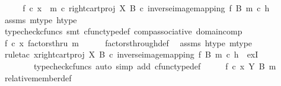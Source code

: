 \begin{isabellebody}
\ \ \isamarkupfalse%
\ \isamarkupfalse%
\ {\isachardoublequoteopen}f\ {\isasymcirc}\isactrlsub c\ x\ {\isacharequal}{\kern0pt}\ m\ {\isasymcirc}\isactrlsub c\ right{\isacharunderscore}{\kern0pt}cart{\isacharunderscore}{\kern0pt}proj\ X\ B\ {\isasymcirc}\isactrlsub c\ inverse{\isacharunderscore}{\kern0pt}image{\isacharunderscore}{\kern0pt}mapping\ f\ B\ m\ {\isasymcirc}\isactrlsub c\ h{\isachardoublequoteclose}\isanewline
\ \ \ \ \isamarkupfalse%
\ assms\ m{\isacharunderscore}{\kern0pt}type\ h{\isacharunderscore}{\kern0pt}type\ \isamarkupfalse%
\ {\isacharparenleft}{\kern0pt}typecheck{\isacharunderscore}{\kern0pt}cfuncs{\isacharcomma}{\kern0pt}\ smt\ cfunc{\isacharunderscore}{\kern0pt}type{\isacharunderscore}{\kern0pt}def\ comp{\isacharunderscore}{\kern0pt}associative\ domain{\isacharunderscore}{\kern0pt}comp{\isacharparenright}{\kern0pt}\isanewline
\ \ \isamarkupfalse%
\ \isamarkupfalse%
\ {\isachardoublequoteopen}{\isacharparenleft}{\kern0pt}f\ {\isasymcirc}\isactrlsub c\ x{\isacharparenright}{\kern0pt}\ factorsthru\ m{\isachardoublequoteclose}\isanewline
\ \ \ \ \isamarkupfalse%
\ factors{\isacharunderscore}{\kern0pt}through{\isacharunderscore}{\kern0pt}def\ \isamarkupfalse%
\ assms\ h{\isacharunderscore}{\kern0pt}type\ m{\isacharunderscore}{\kern0pt}type\isanewline
\ \ \ \ \isamarkupfalse%
\ {\isacharparenleft}{\kern0pt}rule{\isacharunderscore}{\kern0pt}tac\ x{\isacharequal}{\kern0pt}{\isachardoublequoteopen}right{\isacharunderscore}{\kern0pt}cart{\isacharunderscore}{\kern0pt}proj\ X\ B\ {\isasymcirc}\isactrlsub c\ inverse{\isacharunderscore}{\kern0pt}image{\isacharunderscore}{\kern0pt}mapping\ f\ B\ m\ {\isasymcirc}\isactrlsub c\ h{\isachardoublequoteclose}\ \ exI{\isacharcomma}{\kern0pt}\isanewline
\ \ \ \ \ \ \ \ typecheck{\isacharunderscore}{\kern0pt}cfuncs{\isacharcomma}{\kern0pt}\ auto\ simp\ add{\isacharcolon}{\kern0pt}\ cfunc{\isacharunderscore}{\kern0pt}type{\isacharunderscore}{\kern0pt}def{\isacharparenright}{\kern0pt}\isanewline
\ \ \isamarkupfalse%
\ \isamarkupfalse%
\ {\isachardoublequoteopen}f\ {\isasymcirc}\isactrlsub c\ x\ {\isasymin}\isactrlbsub Y\isactrlesub \ {\isacharparenleft}{\kern0pt}B{\isacharcomma}{\kern0pt}\ m{\isacharparenright}{\kern0pt}{\isachardoublequoteclose}\isanewline
\ \ \ \ \isamarkupfalse%
\ relative{\isacharunderscore}{\kern0pt}member{\isacharunderscore}{\kern0pt}def{}\ \isamarkupfalse%

\end{isabellebody}
